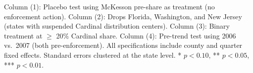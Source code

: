 \begin{table}[htbp]
   \par \raggedright 
   Column (1): Placebo test using McKesson pre-share as treatment (no enforcement action). Column (2): Drops Florida, Washington, and New Jersey (states with suspended Cardinal distribution centers). Column (3): Binary treatment at $\geq$ 20\% Cardinal share. Column (4): Pre-trend test using 2006 vs.~2007 (both pre-enforcement). All specifications include county and quarter fixed effects. Standard errors clustered at the state level. * $p<0.10$, ** $p<0.05$, *** $p<0.01$.
\end{table}


